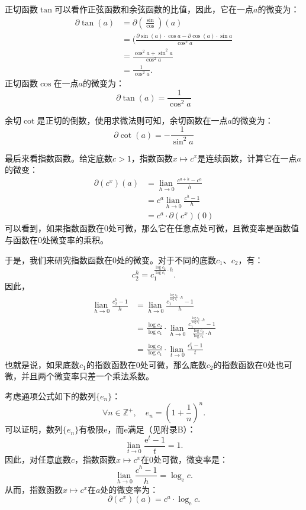 \documentclass[12pt,UTF8]{ctexbook}
\newcommand{\lian}[1]{
    \underset{#1}{\operatorname{lian}\,}
}
\theoremstyle{definition}
\theoremstyle{plain}
\begin{document}
正切函数$\tan$可以看作正弦函数和余弦函数的比值，因此，它在一点$a$的微变为：
\begin{align*}
    \partial \tan(a) &= \partial \left(\frac{\sin}{\cos}\right)(a)  \\
    &= (\frac{\partial \sin(a) \cdot \cos{a} - \partial \cos(a) \cdot \sin{a}}{\cos^2{a}}  \\
    &= \frac{\cos^2{a} + \sin^2{a}}{\cos^2{a}}  \\
    &= \frac{1}{\cos^2{a}}.  
\end{align*}
正切函数$\cos$在一点$a$的微变为：
$$ \partial \tan(a) = \frac{1}{\cos^2{a}} $$

余切$\cot$是正切的倒数，使用求微法则可知，余切函数在一点$a$的微变为：
$$ \partial \cot(a) = -\frac{1}{\sin^2{a}} $$

最后来看指数函数。给定底数$c > 1$，指数函数$x\mapsto c^x$是连续函数，计算它在一点$a$的微变：
\begin{align*}
    \partial (c^x) (a) &= \lian{h\to 0} \frac{c^{a+h} - c^a}{h}  \\
    &= c^a \lian{h\to 0} \frac{c^h - 1}{h}  \\
    &= c^a \cdot \partial (c^x) (0) 
\end{align*}
可以看到，如果指数函数在$0$处可微，那么它在任意点处可微，且微变率是函数值与函数在$0$处微变率的乘积。

于是，我们来研究指数函数在$0$处的微变。对于不同的底数$c_1$、$c_2$，有：
$$c_2^h = c_1^{\frac{\log{c_2}}{\log{c_1}}\cdot h}.$$
因此，
\begin{align*}
    \lian{h\to 0} \frac{c_2^h - 1}{h} &= \lian{h\to 0} \frac{c_1^{\frac{\log{c_2}}{\log{c_1}}\cdot h} - 1}{h}  \\
    &= \frac{\log{c_2}}{\log{c_1}} \cdot \lian{h\to 0} \frac{c_1^{\frac{\log{c_2}}{\log{c_1}}\cdot h} - 1}{\frac{\log{c_2}}{\log{c_1}} \cdot h}  \\
    &= \frac{\log{c_2}}{\log{c_1}} \cdot \lian{t\to 0} \frac{c_1^{t} - 1}{t}  
\end{align*}
也就是说，如果底数$c_1$的指数函数在$0$处可微，那么底数$c_2$的指数函数在$0$处也可微，并且两个微变率只差一个乘法系数。

考虑通项公式如下的数列$\{e_n\}$：
$$ \forall n\in\mathbb{Z}^+,\quad e_n = \left(1 + \frac{1}{n}\right)^n.$$
可以证明，数列$\{e_n\}$有极限$\mathrm{e}$，而$\mathrm{e}$满足（见附录B）：
$$ \lian{t\to 0} \frac{\mathrm{e}^{t} - 1}{t} = 1.$$
因此，对任意底数$c$，指数函数$x\mapsto c^x$在$0$处可微，微变率是：
$$ \lian{h\to 0} \frac{c^h - 1}{h} = \log_{\mathrm{e}}{c}.$$
从而，指数函数$x\mapsto c^x$在$a$处的微变率为：
$$ \partial (c^x) (a) = c^a \cdot \log_{\mathrm{e}}{c}. $$
\end{document}
